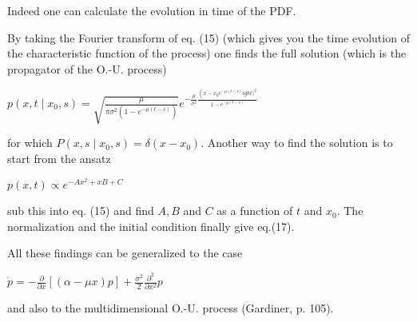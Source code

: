 Indeed one can calculate the evolution in time of the PDF.

By taking the Fourier transform of eq. (15) (which gives you the time evolution of the characteristic function of the process) one finds the full solution (which is the propagator of the O.-U. process)
\begin{DispWithArrows}[tag=17]
    $p\left(x, t \mid x_{0}, s\right)=\sqrt{\frac{\mu}{\pi \sigma^{2}\left(1-e^{-\mu(t-s)}\right)}} e^{-\frac{\mu}{\sigma^{2}} \frac{\left(x-x_{0} e^{-\mu(t-s)}
ight)^{2}}{1-e^{-\mu(t-s)}}}$
\end{DispWithArrows}
for which $P\left(x, s \mid x_{0}, s\right)=\delta\left(x-x_{0}\right)$. Another way to find the solution is to start from the ansatz
\begin{DispWithArrows}
    $p(x, t) \propto e^{-A x^{2}+x B+C}$
\end{DispWithArrows}
sub this into eq. (15) and find $A, B$ and $C$ as a function of $t$ and $x_{0}$. The normalization and the initial condition finally give eq.(17).

All these findings can be generalized to the case
\begin{DispWithArrows}
    $\dot{p}=-\frac{\partial}{\partial x}[(\alpha-\mu x) p]+\frac{\sigma^{2}}{2} \frac{\partial^{2}}{\partial x^{2}} p$
\end{DispWithArrows}
and also to the multidimensional O.-U. process (Gardiner, p. 105).

